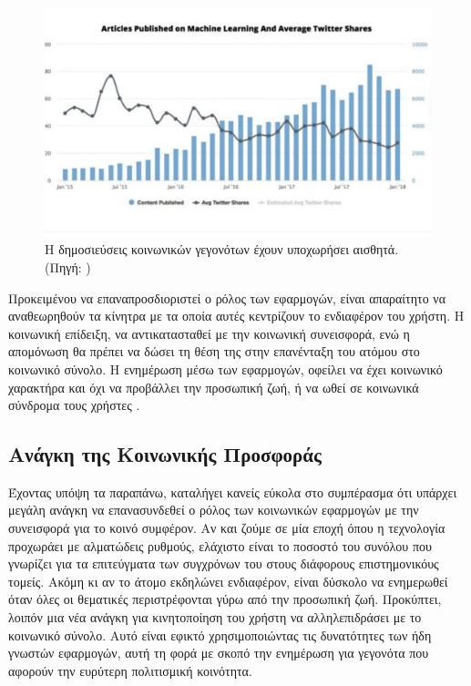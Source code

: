 \begin{figure}[H]
    \includegraphics[scale=0.3]{figures/social-share-has-decreased.png}
    \centering
    \caption{Η δημοσιεύσεις κοινωνικών γεγονότων έχουν υποχωρήσει αισθητά. (Πηγή: \cite{[VEN+18]})}
    \label{socialsharing}
\end{figure}


Προκειμένου να επαναπροσδιοριστεί ο ρόλος των εφαρμογών, είναι απαραίτητο να αναθεωρηθούν τα κίνητρα με τα οποία αυτές κεντρίζουν το ενδιαφέρον του χρήστη. Η κοινωνική επίδειξη, να αντικατασταθεί με την κοινωνική συνεισφορά, ενώ η απομόνωση θα πρέπει να δώσει τη θέση της στην επανένταξη του ατόμου στο κοινωνικό σύνολο. Η ενημέρωση μέσω των εφαρμογών, οφείλει να έχει κοινωνικό χαρακτήρα και όχι να προβάλλει την προσωπική ζωή, ή να ωθεί σε κοινωνικά σύνδρομα τους χρήστες \cite{[BBC+18]}. 

\subsection{Ανάγκη της Κοινωνικής Προσφοράς}
Έχοντας υπόψη τα παραπάνω, καταλήγει κανείς εύκολα στο συμπέρασμα ότι υπάρχει μεγάλη ανάγκη να επανασυνδεθεί ο ρόλος των κοινωνικών εφαρμογών με την συνεισφορά για το κοινό συμφέρον. Αν και ζούμε σε μία εποχή όπου η τεχνολογία προχωράει με αλματώδεις ρυθμούς, ελάχιστο είναι το ποσοστό του συνόλου που γνωρίζει για τα επιτεύγματα των συγχρόνων του στους διάφορους επιστημονικόυς τομείς. Ακόμη κι αν το άτομο εκδηλώνει ενδιαφέρον, είναι δύσκολο να ενημερωθεί όταν όλες οι θεματικές περιστρέφονται γύρω από την προσωπική ζωή. Προκύπτει, λοιπόν μια νέα ανάγκη για κινητοποίηση του χρήστη να αλληλεπιδράσει με το κοινωνικό σύνολο. Αυτό είναι εφικτό χρησιμοποιώντας τις δυνατότητες των ήδη γνωστών εφαρμογών, αυτή τη φορά με σκοπό την ενημέρωση για γεγονότα που αφορούν την ευρύτερη πολιτισμική κοινότητα. 

